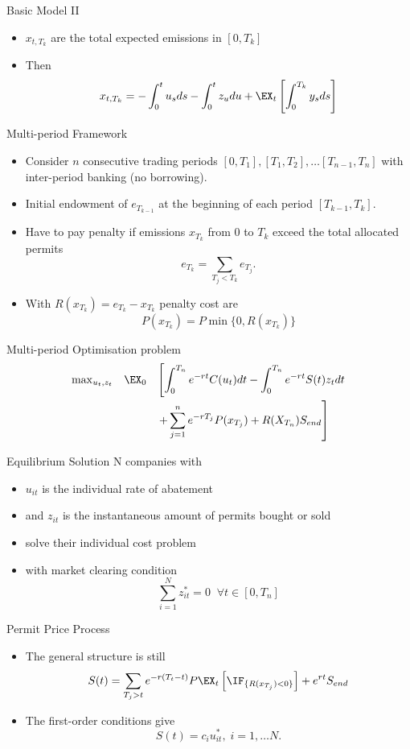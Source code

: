 {Basic Model II}
\begin{itemize}
\item<1-> $x_{t,T_k}$ are the total expected emissions in $[0,T_k]$
\item<2-> Then
\begin{equation}
x_{t,T_k}=-\int_0^tu_s ds  -\int_0^t z_u du + \EX_t\left[\int_0^{T_k} y_s ds \right]
\end{equation}
\end{itemize}



{Multi-period Framework}
\begin{itemize}
\item<1-> Consider $n$ consecutive trading periods $[0,T_1], [T_1, T_2], \ldots [T_{n-1}, T_n]$ with inter-period banking (no borrowing).
\item<2-> Initial endowment of $e_{T_{k-1}}$ at the beginning of each period $[T_{k-1}, T_k]$.
\item<3-> Have to pay penalty if emissions $x_{T_k}$ from $0$ to $T_k$ exceed the total allocated permits
$$
e_{T_k}= \sum_{T_j < T_k}e_{T_j}.
$$
\item<4-> With $R(x_{T_k})=e_{T_k}-x_{T_k}$ penalty cost are
$$
P(x_{T_k}) = P \min\{0, R(x_{T_k})\}
$$
\end{itemize}


{Multi-period Optimisation problem}
$$
\begin{array}{lll}
\max_{u_t, z_t} & \EX_0& \left[ \displaystyle\int_0^{T_n}e^{-rt}C(u_t)dt - \int_0^{T_n}e^{-rt}S(t) z_tdt \right. \\*[12pt]
& & \displaystyle \left. + \sum_{j=1}^n e^{-rT_j}P(x_{T_j}) + R(X_{T_n}) S_{end}\right]
\end{array}
$$


{Equilibrium Solution}
N companies with
\begin{itemize}
\item<1-> $u_{it}$ is the individual rate of abatement
\item<2-> and $z_{it}$ is the instantaneous amount of permits bought or sold
\item<3-> solve their individual cost problem
\item<4-> with market clearing condition
$$
\sum_{i=1}^N z_{it}^*=0 \;\;  \forall t \in [0, T_n]
$$
\end{itemize}


{Permit Price Process}
\begin{itemize}
\item<1-> The general structure is still
$$
S(t) = \sum_{T_j >t} e^{-r(T_t-t)} P \EX_t\left[\IF_{\{R(x_{T_j})<0\}}\right] + e^{rt} S_{end}
$$
\item<2-> The first-order conditions give
$$
S(t) = c_i u_{it}^*, \; i=1, \ldots N.
$$
\end{itemize}





